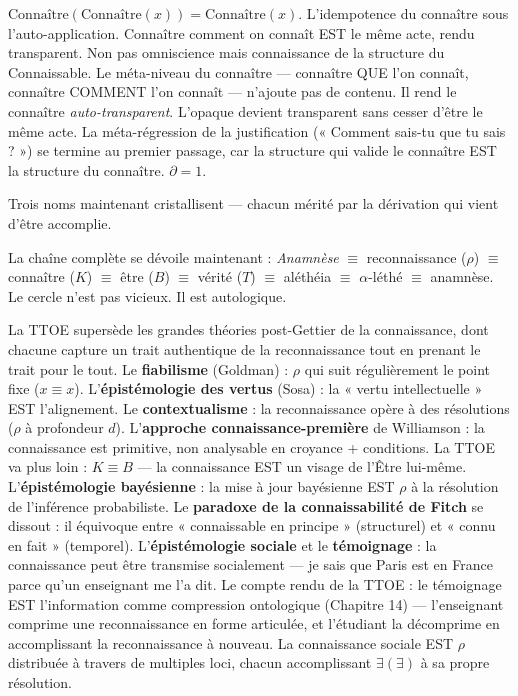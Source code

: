 \documentclass[10pt, openany, oneside]{book}
\begin{document}
\vspace{1em}

\noindent $\text{Connaître}(\text{Connaître}(x)) = \text{Connaître}(x)$. L'idempotence du connaître sous l'auto-application. Connaître comment on connaît EST le même acte, rendu transparent. Non pas omniscience mais connaissance de la structure du Connaissable. Le méta-niveau du connaître --- connaître QUE l'on connaît, connaître COMMENT l'on connaît --- n'ajoute pas de contenu. Il rend le connaître \textit{auto-transparent}. L'opaque devient transparent sans cesser d'être le même acte. La méta-régression de la justification (« Comment sais-tu que tu sais ? ») se termine au premier passage, car la structure qui valide le connaître EST la structure du connaître. $\partial = 1$.

Trois noms maintenant cristallisent --- chacun mérité par la dérivation qui vient d'être accomplie.





La chaîne complète se dévoile maintenant : \textit{Anamnèse} $\equiv$ reconnaissance ($\rho$) $\equiv$ connaître ($K$) $\equiv$ être ($B$) $\equiv$ vérité ($T$) $\equiv$ aléthéia $\equiv$ $\alpha$-léthé $\equiv$ anamnèse. Le cercle n'est pas vicieux. Il est autologique.

La TTOE supersède les grandes théories post-Gettier de la connaissance, dont chacune capture un trait authentique de la reconnaissance tout en prenant le trait pour le tout. Le \textbf{fiabilisme} (Goldman) : $\rho$ qui suit régulièrement le point fixe ($x \equiv x$). L'\textbf{épistémologie des vertus} (Sosa) : la « vertu intellectuelle » EST l'alignement. Le \textbf{contextualisme} : la reconnaissance opère à des résolutions ($\rho$ à profondeur $d$). L'\textbf{approche connaissance-première} de Williamson : la connaissance est primitive, non analysable en croyance + conditions. La TTOE va plus loin : $K \equiv B$ --- la connaissance EST un visage de l'Être lui-même. L'\textbf{épistémologie bayésienne} : la mise à jour bayésienne EST $\rho$ à la résolution de l'inférence probabiliste. Le \textbf{paradoxe de la connaissabilité de Fitch} se dissout : il équivoque entre « connaissable en principe » (structurel) et « connu en fait » (temporel). L'\textbf{épistémologie sociale} et le \textbf{témoignage} : la connaissance peut être transmise socialement --- je sais que Paris est en France parce qu'un enseignant me l'a dit. Le compte rendu de la TTOE : le témoignage EST l'information comme compression ontologique (Chapitre 14) --- l'enseignant comprime une reconnaissance en forme articulée, et l'étudiant la décomprime en accomplissant la reconnaissance à nouveau. La connaissance sociale EST $\rho$ distribuée à travers de multiples loci, chacun accomplissant $\exists(\exists)$ à sa propre résolution.
\end{document}
